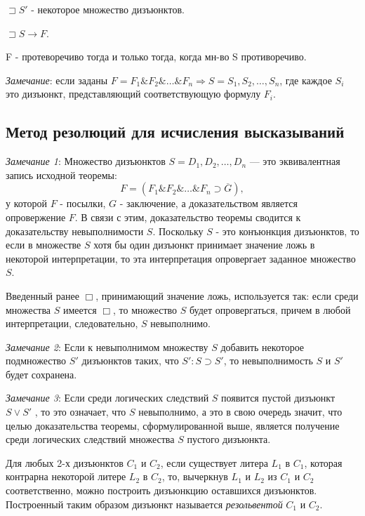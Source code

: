 \documentclass[a4paper,12pt]{report}
\begin{document}
	$\sqsupset S'$ - некоторое множество дизъюнктов.\par
	$\sqsupset S \to F$.\par
	F - протеворечиво тогда и только тогда, когда мн-во S противоречиво. \\ \par

	\textit{Замечание}: если заданы $F = F_1 \& F_2 \& \ldots \& F_n \Rightarrow
	S = {S_1, S_2, \ldots , S_n}$, где каждое $S_i$ это дизъюнкт, представляющий
	соответствующую формулу $F_i$.


\subsection{Метод резолюций для исчисления высказываний}

	\textit{Замечание 1}: Множество дизъюнктов $S = {D_1, D_2, \ldots , D_n}$ —
	это эквивалентная запись исходной теоремы:
	$$ F = (F_1 \& F_2 \& \ldots \& F_n \supset \overline{G}),$$
	у которой $F$ - посылки, $G$ - заключение, а доказательством является
	опровержение $F$. В связи с этим, доказательство теоремы сводится к
	доказательству невыполнимости $S$. Поскольку $S$ - это конъюнкция дизъюнктов,
	то если в множестве $S$ хотя бы один дизъюнкт принимает значение ложь в
	некоторой интерпретации, то эта интерпретация опровергает заданное множество
	$S$.\par
	Введенный ранее $\Box$, принимающий значение ложь, используется так: если
	среди множества $S$ имеется $\Box$, то множество $S$ будет опровергаться,
	причем в любой интерпретации, следовательно, $S$ невыполнимо.\\ \par
	\textit{Замечание 2}: Если к невыполнимом множеству $S$ добавить некоторое
	подмножество $S'$ дизъюнктов таких, что $S' : S \supset S'$, то
	невыполнимость $S$ и $S'$ будет сохранена.\\ \par

	\textit{Замечание 3}: Если среди логических следствий $S$ появится пустой
	дизъюнкт $S \vee S'$ , то это означает, что $S$ невыполнимо, а это в свою
	очередь значит, что целью доказательства теоремы, сформулированной выше,
	является получение среди логических следствий множества $S$ пустого
	дизъюнкта. \\ \par

	Для любых 2-х дизъюнктов $C_1$ и $C_2$, если существует литера $L_1$ в $C_1$,
	которая контрарна некоторой литере $L_2$ в $C_2$, то, вычеркнув $L_1$ и $L_2$
	из $C_1$ и $C_2$ соответственно, можно построить дизъюнкцию оставшихся
	дизъюнктов. Построенный таким образом дизъюнкт называется
	\textit{резольвентой} $C_1$ и $C_2$. \\ \par
\end{document}
